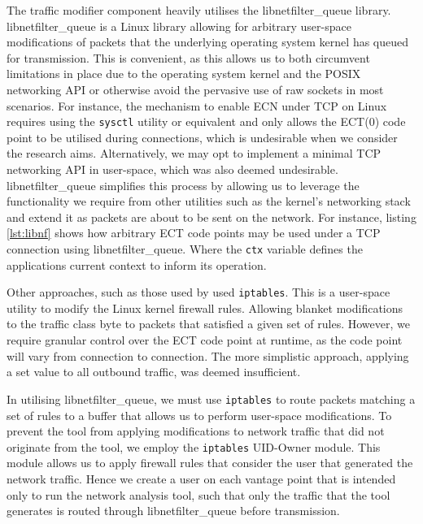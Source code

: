 \documentclass{l4proj}
\begin{document}
The traffic modifier component heavily utilises the libnetfilter\_queue library. libnetfilter\_queue is a Linux library allowing for arbitrary user-space modifications of packets that the underlying operating system kernel has queued for transmission. This is convenient, as this allows us to both circumvent limitations in place due to the operating system kernel and the POSIX networking API or otherwise avoid the pervasive use of raw sockets in most scenarios. For instance, the mechanism to enable ECN under TCP on Linux requires using the \lstinline{sysctl} utility or equivalent and only allows the ECT(0) code point to be utilised during connections, which is undesirable when we consider the research aims. Alternatively, we may opt to implement a minimal TCP networking API in user-space, which was also deemed undesirable. libnetfilter\_queue simplifies this process by allowing us to leverage the functionality we require from other utilities such as the kernel's networking stack and extend it as packets are about to be sent on the network. For instance, listing \ref{lst:libnf} shows how arbitrary ECT code points may be used under a TCP connection using libnetfilter\_queue. Where the \lstinline{ctx} variable defines the applications current context to inform its operation.

Other approaches, such as those used by \cite{bauer_measuring_2011} used \lstinline{iptables}. This is a user-space utility to modify the Linux kernel firewall rules. Allowing blanket modifications to the traffic class byte to packets that satisfied a given set of rules. However, we require granular control over the ECT code point at runtime, as the code point will vary from connection to connection. The more simplistic approach, applying a set value to all outbound traffic, was deemed insufficient.

In utilising libnetfilter\_queue, we must use \lstinline{iptables} to route packets matching a set of rules to a buffer that allows us to perform user-space modifications. To prevent the tool from applying modifications to network traffic that did not originate from the tool, we employ the \lstinline{iptables} UID-Owner module. This module allows us to apply firewall rules that consider the user that generated the network traffic. Hence we create a user on each vantage point that is intended only to run the network analysis tool, such that only the traffic that the tool generates is routed through libnetfilter\_queue before transmission.
\end{document}
